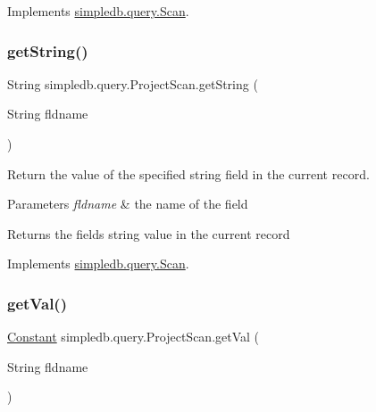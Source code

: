 Implements \hyperlink{interfacesimpledb_1_1query_1_1Scan_a2e064555e16240115167b5d42d2b3d19}{simpledb.\+query.\+Scan}.

\mbox{\label{classsimpledb_1_1query_1_1ProjectScan_afaf845b45f703794f37b6c48d68a753a}} 
\subsubsection{\texorpdfstring{get\+String()}{getString()}}
{\footnotesize\ttfamily String simpledb.\+query.\+Project\+Scan.\+get\+String (\begin{DoxyParamCaption}\item[{String}]{fldname }\end{DoxyParamCaption})\hspace{0.3cm}{\ttfamily [inline]}}

Return the value of the specified string field in the current record. 
\begin{DoxyParams}{Parameters}
{\em fldname} & the name of the field \\
\hline
\end{DoxyParams}
\begin{DoxyReturn}{Returns}
the field\textquotesingle{}s string value in the current record 
\end{DoxyReturn}


Implements \hyperlink{interfacesimpledb_1_1query_1_1Scan_a922e219fee53ecfa6163525f9e3ef222}{simpledb.\+query.\+Scan}.

\mbox{\label{classsimpledb_1_1query_1_1ProjectScan_a519337a8db86470d88e8bc24c068e53b}} 
\subsubsection{\texorpdfstring{get\+Val()}{getVal()}}
{\footnotesize\ttfamily \hyperlink{classsimpledb_1_1query_1_1Constant}{Constant} simpledb.\+query.\+Project\+Scan.\+get\+Val (\begin{DoxyParamCaption}\item[{String}]{fldname }\end{DoxyParamCaption})\hspace{0.3cm}{\ttfamily [inline]}}

